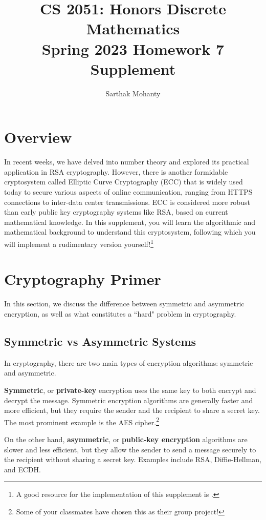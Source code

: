 \documentclass{article}
\title{\vspace{-1cm}CS 2051: Honors Discrete Mathematics \\Spring 2023 Homework 7 Supplement}
\author{Sarthak Mohanty}
\date{}
\begin{document}
\maketitle

\section*{Overview}

In recent weeks, we have delved into number theory and explored its practical application in RSA cryptography. However, there is another formidable cryptosystem called Elliptic Curve Cryptography (ECC) that is widely used today to secure various aspects of online communication, ranging from HTTPS connections to inter-data center transmissions. ECC is considered more robust than early public key cryptography systems like RSA, based on current mathematical knowledge. In this supplement, you will learn the algorithmic and mathematical background to understand this cryptosystem, following which you will implement a rudimentary version yourself!\footnote{A good resource for the implementation of this supplement is \cite{ec_blog}.}

\section*{Cryptography Primer}
    In this section, we discuss the difference between symmetric and asymmetric encryption, as well as what constitutes a ``hard" problem in cryptography.

\subsection*{Symmetric vs Asymmetric Systems}

    In cryptography, there are two main types of encryption algorithms: symmetric and asymmetric. 

    \vspace{3mm}
    \textbf{Symmetric}, or \textbf{private-key} encryption uses the same key to both encrypt and decrypt the message. Symmetric encryption algorithms are generally faster and more efficient, but they require the sender and the recipient to share a secret key. The most prominent example is the AES cipher.\footnote{Some of your classmates have chosen this as their group project!} 

    \vspace{3mm}
    On the other hand, \textbf{asymmetric}, or \textbf{public-key encryption} algorithms are slower and less efficient, but they allow the sender to send a message securely to the recipient without sharing a secret key. Examples include RSA, Diffie-Hellman, and ECDH.
\end{document}
